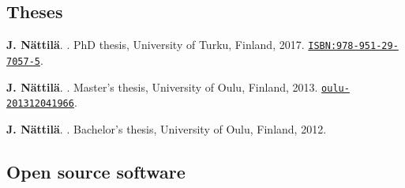 \documentclass[10pt]{article}
\begin{document}
\subsection*{\phantom{sub} Theses}

\vspace{-20pt}
%
\begin{thebibliography}{3}
\vspace{-5pt}

\textbf{J. N\"attil\"a}.
.
\newblock PhD thesis, University of Turku, Finland, 2017. \href{http://urn.fi/URN:ISBN:978-951-29-7057-5}{\nolinkurl{ISBN:978-951-29-7057-5}}.

\textbf{J. N\"attil\"a}.
.
\newblock Master's thesis, University of Oulu, Finland, 2013. \href{http://urn.fi/URN:NBN:fi:oulu-201312041966}{\nolinkurl{oulu-201312041966}}.

\textbf{J. N\"attil\"a}.
.
\newblock Bachelor's thesis, University of Oulu, Finland, 2012.

\end{thebibliography}

\vspace{-5pt}
\subsection*{\phantom{sub} Open source software}
\end{document}
